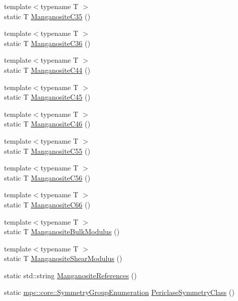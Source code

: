 \begin{DoxyCompactItemize}
{\footnotesize template$<$typename T $>$ }\\static T \mbox{\hyperlink{namespacempc_1_1data_ad2d0a52c6dd9a61c7c91a37a380dfca8}{Manganosite\+C35}} ()
\item 
{\footnotesize template$<$typename T $>$ }\\static T \mbox{\hyperlink{namespacempc_1_1data_ad81b093dedf34da284448282f87ef2d6}{Manganosite\+C36}} ()
\item 
{\footnotesize template$<$typename T $>$ }\\static T \mbox{\hyperlink{namespacempc_1_1data_a58aaf130791119a1e12954590542f812}{Manganosite\+C44}} ()
\item 
{\footnotesize template$<$typename T $>$ }\\static T \mbox{\hyperlink{namespacempc_1_1data_ad5a113ff039a3422694174d12414bcfa}{Manganosite\+C45}} ()
\item 
{\footnotesize template$<$typename T $>$ }\\static T \mbox{\hyperlink{namespacempc_1_1data_a32311b19695d4687845495b29c284c07}{Manganosite\+C46}} ()
\item 
{\footnotesize template$<$typename T $>$ }\\static T \mbox{\hyperlink{namespacempc_1_1data_ae5bbb5938c2eccba409cf2aa4c742f47}{Manganosite\+C55}} ()
\item 
{\footnotesize template$<$typename T $>$ }\\static T \mbox{\hyperlink{namespacempc_1_1data_ab572b62f814367506fe73eb0c3f56355}{Manganosite\+C56}} ()
\item 
{\footnotesize template$<$typename T $>$ }\\static T \mbox{\hyperlink{namespacempc_1_1data_aeaba2f4484fa8b5a49ea94eb594d570b}{Manganosite\+C66}} ()
\item 
{\footnotesize template$<$typename T $>$ }\\static T \mbox{\hyperlink{namespacempc_1_1data_a409ed4889b8f38083b3ed28ca912de43}{Manganosite\+Bulk\+Modulus}} ()
\item 
{\footnotesize template$<$typename T $>$ }\\static T \mbox{\hyperlink{namespacempc_1_1data_a60a1ab00d5894da16bafe12bb9c56b5f}{Manganosite\+Shear\+Modulus}} ()
\item 
static std\+::string \mbox{\hyperlink{namespacempc_1_1data_a19bd541cd7d6aa25b9e5334a0803a98f}{Manganosite\+References}} ()
\item 
static \mbox{\hyperlink{namespacempc_1_1core_a9d979684062547055a0ef5c13077bad8}{mpc\+::core\+::\+Symmetry\+Group\+Enumeration}} \mbox{\hyperlink{namespacempc_1_1data_a73da7705d53153e252c5936f1a81778d}{Periclase\+Symmetry\+Class}} ()

\end{DoxyCompactItemize}
